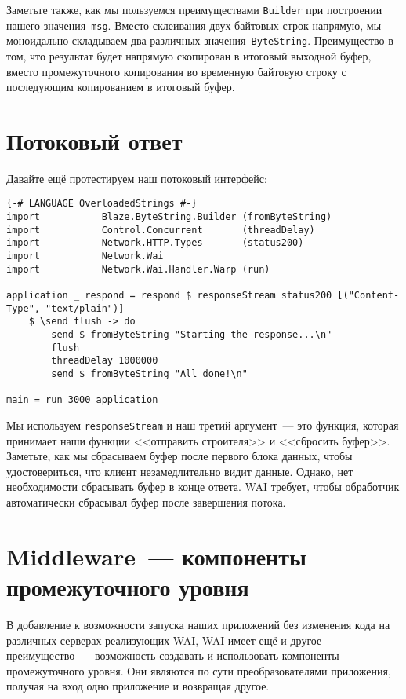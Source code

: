 Заметьте также, как мы пользуемся преимуществами \lstinline'Builder' при
построении нашего значения~\lstinline'msg'. Вместо склеивания двух байтовых
строк напрямую, мы моноидально складываем два различных
значения~\lstinline'ByteString'. Преимущество в том, что результат будет
напрямую скопирован в итоговый выходной буфер, вместо промежуточного
копирования во временную байтовую строку с последующим копированием в итоговый
буфер.

\section{Потоковый ответ}
Давайте ещё протестируем наш потоковый интерфейс:
\begin{lstlisting}
{-# LANGUAGE OverloadedStrings #-}
import           Blaze.ByteString.Builder (fromByteString)
import           Control.Concurrent       (threadDelay)
import           Network.HTTP.Types       (status200)
import           Network.Wai
import           Network.Wai.Handler.Warp (run)

application _ respond = respond $ responseStream status200 [("Content-Type", "text/plain")]
    $ \send flush -> do
        send $ fromByteString "Starting the response...\n"
        flush
        threadDelay 1000000
        send $ fromByteString "All done!\n"

main = run 3000 application
\end{lstlisting}

Мы используем \lstinline'responseStream' и наш третий аргумент~--- это функция,
которая принимает наши функции <<отправить строителя>> и <<сбросить буфер>>.
Заметьте, как мы сбрасываем буфер после первого блока данных, чтобы
удостовериться, что клиент незамедлительно видит данные. Однако, нет
необходимости сбрасывать буфер в конце ответа. WAI требует, чтобы обработчик
автоматически сбрасывал буфер после завершения потока.

\section {Middleware~--- компоненты промежуточного уровня}

В добавление к возможности запуска наших приложений без изменения кода на
различных серверах реализующих WAI, WAI имеет ещё и другое преимущество~---
возможность создавать и использовать компоненты промежуточного уровня. Они
являются по сути преобразователями приложения, получая на вход одно приложение
и возвращая другое.

